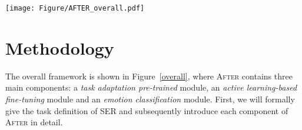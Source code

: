 \documentclass{article}
\begin{document}











\begin{figure*}[ht]
\texttt{[image: Figure/AFTER\_overall.pdf]}
\centering
\caption{Model overview. We first pre-train an off-the-shelf wav2vec 2.0 in the task adaptation pre-training manner. Then, we adopt an active learning method to select unlabeled samples for annotation iteratively. These labeled samples are used to fine-tune the wav2vec 2.0 model for speech emotion recognition.}
\label{overall}
\end{figure*}


\section{Methodology}
\label{method}
The overall framework is shown in Figure~\ref{overall}, where \textsc{After} contains three main components: a \textit{task adaptation pre-trained} module, an \textit{active learning-based fine-tuning} module and an \textit{emotion classification} module. 
First, we will formally give the task definition of SER and subsequently introduce each component of \textsc{After} in detail. 
\end{document}
